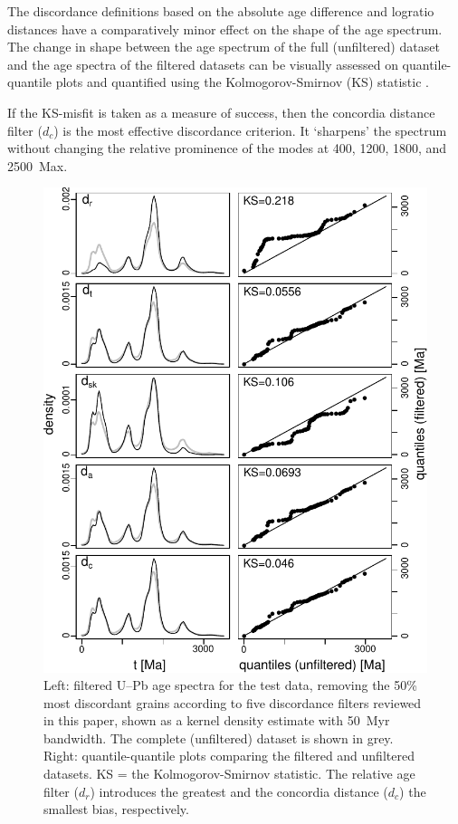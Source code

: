 \documentclass[gchron, manuscript]{copernicus}
\begin{document}
The discordance definitions based on the absolute age difference and
logratio distances have a comparatively minor effect on the shape of
the age spectrum. The change in shape between the age spectrum of the
full (unfiltered) dataset and the age spectra of the filtered datasets
can be visually assessed on quantile-quantile plots and quantified
using the Kolmogorov-Smirnov (KS) statistic \citep{vermeesch2013}.

If the KS-misfit is taken as a measure of success, then the concordia
distance filter ($d_c$) is the most effective discordance
criterion. It `sharpens' the spectrum without changing the relative
prominence of the modes at 400, 1200, 1800, and 2500~Max.

\begin{figure}[t]
  \includegraphics[width=12cm]{KDEs.pdf}
  \caption{Left: filtered U--Pb age spectra for the test data,
    removing the 50\% most discordant grains according to five
    discordance filters reviewed in this paper, shown as a kernel
    density estimate with 50~Myr bandwidth. The complete (unfiltered)
    dataset is shown in grey. Right: quantile-quantile plots comparing
    the filtered and unfiltered datasets. KS = the Kolmogorov-Smirnov
    statistic. The relative age filter ($d_r$) introduces the greatest
    and the concordia distance ($d_c$) the smallest bias,
    respectively.}
  \label{fig:KDEs}
\end{figure}
\end{document}
